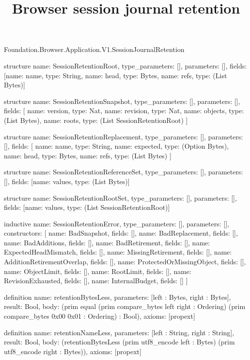 \begin{lexlean}{Foundation.Browser.Application.V1.SessionJournalRetention}
\title{Browser session journal retention}
\begin{semanticmodule}
structure{
  name: SessionRetentionRoot,
  type_parameters: [],
  parameters: [],
  fields: [{name: name, type: String}, {name: head, type: Bytes}, {name: refs, type: (List Bytes)}]
}

structure{
  name: SessionRetentionSnapshot,
  type_parameters: [],
  parameters: [],
  fields: [
    {name: version, type: Nat},
    {name: revision, type: Nat},
    {name: objects, type: (List Bytes)},
    {name: roots, type: (List SessionRetentionRoot)}
  ]
}

structure{
  name: SessionRetentionReplacement,
  type_parameters: [],
  parameters: [],
  fields: [
    {name: name, type: String},
    {name: expected, type: (Option Bytes)},
    {name: head, type: Bytes},
    {name: refs, type: (List Bytes)}
  ]
}

structure{
  name: SessionRetentionReferenceSet,
  type_parameters: [],
  parameters: [],
  fields: [{name: values, type: (List Bytes)}]
}

structure{
  name: SessionRetentionRootSet,
  type_parameters: [],
  parameters: [],
  fields: [{name: values, type: (List SessionRetentionRoot)}]
}

inductive{
  name: SessionRetentionError,
  type_parameters: [],
  parameters: [],
  constructors: [
    {name: BadSnapshot, fields: []},
    {name: BadReplacement, fields: []},
    {name: BadAdditions, fields: []},
    {name: BadRetirement, fields: []},
    {name: ExpectedHeadMismatch, fields: []},
    {name: MissingRetirement, fields: []},
    {name: AdditionRetirementOverlap, fields: []},
    {name: ProtectedOrMissingObject, fields: []},
    {name: ObjectLimit, fields: []},
    {name: RootLimit, fields: []},
    {name: RevisionExhausted, fields: []},
    {name: InternalBudget, fields: []}
  ]
}

definition{
  name: retentionBytesLess,
  parameters: [left : Bytes, right : Bytes],
  result: Bool,
  body: (prim equal (prim compare_bytes left right : Ordering) (prim compare_bytes 0x00 0x01 : Ordering) : Bool),
  axioms: [propext]
}

definition{
  name: retentionNameLess,
  parameters: [left : String, right : String],
  result: Bool,
  body: (retentionBytesLess (prim utf8_encode left : Bytes) (prim utf8_encode right : Bytes)),
  axioms: [propext]
}


\end{semanticmodule}
\end{lexlean}
